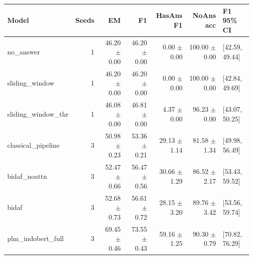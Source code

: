 \begin{tabular}{lrrrrrl}
\toprule
Model & Seeds & EM & F1 & HasAns F1 & NoAns acc & F1 95\% CI \\
\midrule
no\_answer & 1 & 46.20 $\pm$ 0.00 & 46.20 $\pm$ 0.00 & 0.00 $\pm$ 0.00 & 100.00 $\pm$ 0.00 & [42.59, 49.44] \\
sliding\_window & 1 & 46.20 $\pm$ 0.00 & 46.20 $\pm$ 0.00 & 0.00 $\pm$ 0.00 & 100.00 $\pm$ 0.00 & [42.84, 49.69] \\
sliding\_window\_thr & 1 & 46.08 $\pm$ 0.00 & 46.81 $\pm$ 0.00 & 4.37 $\pm$ 0.00 & 96.23 $\pm$ 0.00 & [43.07, 50.25] \\
classical\_pipeline & 3 & 50.98 $\pm$ 0.23 & 53.36 $\pm$ 0.21 & 29.13 $\pm$ 1.14 & 81.58 $\pm$ 1.34 & [49.98, 56.49] \\
bidaf\_noattn & 3 & 52.47 $\pm$ 0.66 & 56.47 $\pm$ 0.56 & 30.66 $\pm$ 1.29 & 86.52 $\pm$ 2.17 & [53.43, 59.52] \\
bidaf & 3 & 52.68 $\pm$ 0.73 & 56.61 $\pm$ 0.72 & 28.15 $\pm$ 3.20 & 89.76 $\pm$ 3.42 & [53.56, 59.74] \\
plm\_indobert\_full & 3 & 69.45 $\pm$ 0.46 & 73.55 $\pm$ 0.43 & 59.16 $\pm$ 1.25 & 90.30 $\pm$ 0.79 & [70.82, 76.29] \\
\bottomrule
\end{tabular}
